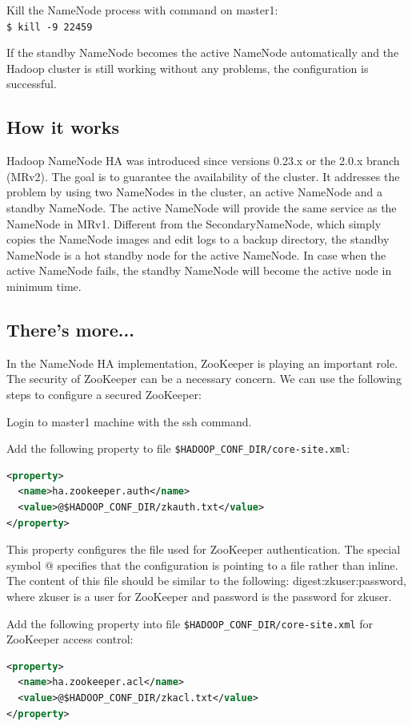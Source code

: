 Kill the NameNode process with command on master1: \\
\verb|$ kill -9 22459|

If the standby NameNode becomes the active NameNode automatically and the Hadoop cluster is still working without any problems, the configuration is successful.

\subsection*{How it works}
Hadoop NameNode HA was introduced since versions 0.23.x or the 2.0.x branch (MRv2). The goal is to guarantee the availability of the cluster. It addresses the problem by using two NameNodes in the cluster, an active NameNode and a standby NameNode. The active NameNode will provide the same service as the NameNode in MRv1. Different from the SecondaryNameNode, which simply copies the NameNode images and edit logs to a backup directory, the standby NameNode is a hot standby node for the active NameNode. In case when the active NameNode fails, the standby NameNode will become the active node in minimum time.
\subsection*{There's more...}
In the NameNode HA implementation, ZooKeeper is playing an important role. The security of ZooKeeper can be a necessary concern. We can use the following steps to configure a secured ZooKeeper:

Login to master1 machine with the ssh command.

Add the following property to file \verb|$HADOOP_CONF_DIR/core-site.xml|:
\lstset{style=bashstyle}
\begin{lstlisting}[language=XML]
<property>
  <name>ha.zookeeper.auth</name>
  <value>@$HADOOP_CONF_DIR/zkauth.txt</value>
</property>
\end{lstlisting}

This property configures the file used for ZooKeeper authentication. The special symbol @ specifies that the configuration is pointing to a file rather than inline. The content of this file should be similar to the following: digest:zkuser:password, where zkuser is a user for ZooKeeper and password is the password for zkuser.


Add the following property into file \verb|$HADOOP_CONF_DIR/core-site.xml| for ZooKeeper access control:
\lstset{style=bashstyle}
\begin{lstlisting}[language=XML]
<property>
  <name>ha.zookeeper.acl</name>
  <value>@$HADOOP_CONF_DIR/zkacl.txt</value>
</property>
\end{lstlisting}


